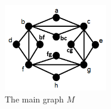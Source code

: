\begin{figure}[htb]	
\center%
\includegraphics[width=4.5cm]{./img/gadgetBase.png}
\caption{The main graph $M$}
\label{fig:gadgetBase}
\end{figure}